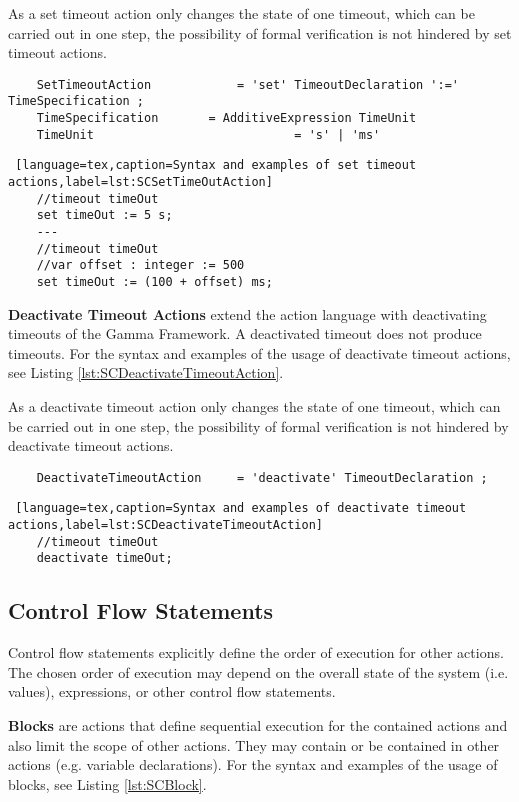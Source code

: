 As a set timeout action only changes the state of one timeout, which can be carried out in one step, the possibility of formal verification is not hindered by set timeout actions.
\bigskip
\begin{lstlisting}
	SetTimeoutAction 			= 'set' TimeoutDeclaration ':=' TimeSpecification ;	
	TimeSpecification 		= AdditiveExpression TimeUnit
	TimeUnit 							= 's' | 'ms'
\end{lstlisting}
\begin{lstlisting} [language=tex,caption=Syntax and examples of set timeout actions,label=lst:SCSetTimeOutAction]
	//timeout timeOut
	set timeOut := 5 s;
	---
	//timeout timeOut
	//var offset : integer := 500
	set timeOut := (100 + offset) ms;
\end{lstlisting}

\textbf{Deactivate Timeout Actions} extend the action language with deactivating timeouts of the Gamma Framework. A deactivated timeout does not produce timeouts. For the syntax and examples of the usage of deactivate timeout actions, see Listing \ref{lst:SCDeactivateTimeoutAction}.

As a deactivate timeout action only changes the state of one timeout, which can be carried out in one step, the possibility of formal verification is not hindered by deactivate timeout actions.
\bigskip
\begin{lstlisting}
	DeactivateTimeoutAction 	= 'deactivate' TimeoutDeclaration ;
\end{lstlisting}
\begin{lstlisting} [language=tex,caption=Syntax and examples of deactivate timeout actions,label=lst:SCDeactivateTimeoutAction]
	//timeout timeOut
	deactivate timeOut;
\end{lstlisting}

\subsection{Control Flow Statements}
Control flow statements explicitly define the order of execution for other actions. The chosen order of execution may depend on the overall state of the system (i.e. values), expressions, or other control flow statements.

\bigskip
\textbf{Blocks} are actions that define sequential execution for the contained actions and also limit the scope of other actions. They may contain or be contained in other actions (e.g. variable declarations). For the syntax and examples of the usage of blocks, see Listing \ref{lst:SCBlock}.

